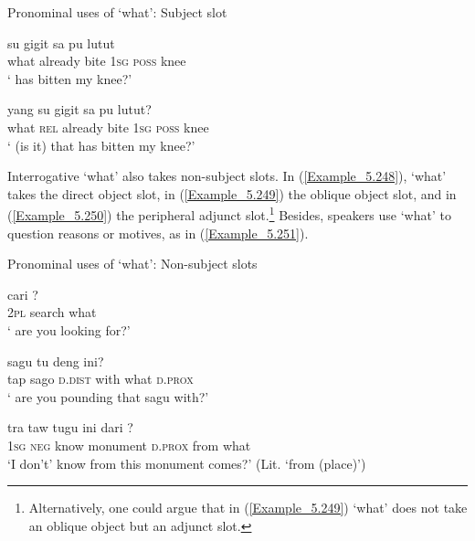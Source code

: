 \begin{styleExampleTitle}
Pronominal uses of  ‘what’: Subject slot
\end{styleExampleTitle}

\ea
\label{Example_5.246}
 {su} {gigit} {sa} {pu} {lutut}\\ %
 what  already  bite  \textsc{1sg}  \textsc{poss}  knee\\
\glt 
‘ has bitten my knee?’ \textstyleExampleSource{[Elicited MY131112.005]}
\z

\ea
\label{Example_5.247}
 {yang} {su} {gigit} {sa} {pu} {lutut?}\\ %
 what  \textsc{rel}  already  bite  \textsc{1sg}  \textsc{poss}  knee\\
\glt 
‘ (is it) that has bitten my knee?’ \textstyleExampleSource{[080916-001-CvNP.0004]}
\z


Interrogative  ‘what’ also takes non-subject slots. In (\ref{Example_5.248}),  ‘what’ takes the direct object slot, in (\ref{Example_5.249}) the oblique object slot, and in (\ref{Example_5.250}) the peripheral adjunct slot.\footnote{Alternatively, one could argue that in (\ref{Example_5.249})  ‘what’ does not take an oblique object but an adjunct slot.} Besides, speakers use  ‘what’ to question reasons or motives, as in (\ref{Example_5.251}).


\begin{styleExampleTitle}
Pronominal uses of  ‘what’: Non-subject slots
\end{styleExampleTitle}

\ea
\label{Example_5.248}
 {cari} {?}\\ %
 \textsc{2pl}  search  what\\
\glt 
‘ are you looking for?’ \textstyleExampleSource{[080917-006-CvHt.0001]}
\z

\ea
\label{Example_5.249}
 {sagu} {tu} {deng} {} {ini?}\\ %
 tap  sago  \textsc{d.dist}  with  what  \textsc{d.prox}\\
\glt 
‘ are you pounding that sagu with?’ \textstyleExampleSource{[081014-006-CvPr.0014]}
\z

\ea
\label{Example_5.250}
 {tra} {taw} {tugu} {ini} {dari} {?}\\ %
 \textsc{1sg}  \textsc{neg}  know  monument  \textsc{d.prox}  from  what\\
\glt 
‘I don’t’ know from  this monument comes?’ (Lit. ‘from  (place)’) \textstyleExampleSource{[080917-008-NP.0003]}
\z

